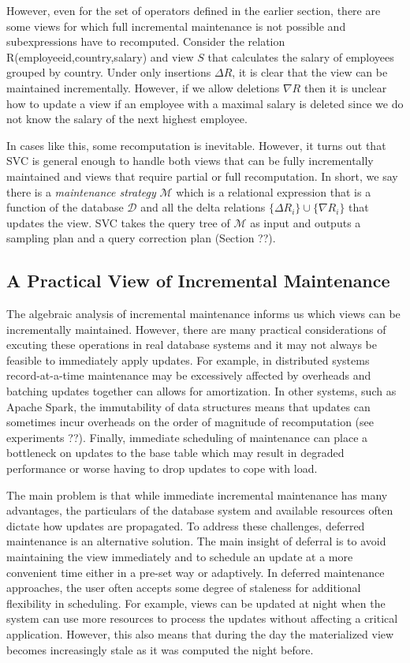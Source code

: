 However, even for the set of operators defined in the earlier section, there are some views for which full incremental maintenance is not possible and subexpressions have to recomputed. Consider the relation R(employeeid,country,salary) and view $S$ that calculates the \maxfunc salary of employees grouped by country. Under only insertions $\Delta R$, it is clear that the view can be maintained incrementally. 
However, if we allow deletions $\nabla R$ then it is unclear how to update a view if an employee with a maximal salary is deleted since we do not know the salary of the next highest employee. 

In cases like this, some recomputation is inevitable.
However, it turns out that SVC is general enough to handle both views that can be fully incrementally maintained and views that require partial or full recomputation.
In short, we say there is a \emph{maintenance strategy} $\mathcal{M}$ which is a relational expression that is a function of the database $\mathcal{D}$ and all the delta relations $\{\Delta R_i\} \cup \{\nabla R_i\}$ that updates the view.
SVC takes the query tree of $\mathcal{M}$ as input and outputs a sampling plan and a query correction plan (Section ??).

\subsection{A Practical View of Incremental Maintenance}
The algebraic analysis of incremental maintenance informs us which views can be incrementally maintained.
However, there are many practical considerations of excuting these operations in real database systems and it may not always be feasible to immediately apply updates.
For example, in distributed systems record-at-a-time maintenance may be excessively affected by overheads and batching updates together can allows for amortization.
In other systems, such as Apache Spark, the immutability of data structures means that updates can sometimes incur overheads on the order of magnitude of recomputation (see experiments ??).
Finally, immediate scheduling of maintenance can place a bottleneck on updates to the base table which may result in degraded performance or worse having to drop updates to cope with load.

The main problem is that while immediate incremental maintenance has many advantages, the particulars of the database system and available resources often dictate how updates are propagated.
To address these challenges, deferred maintenance is an alternative solution.
The main insight of deferral is to avoid maintaining the view immediately and to schedule an update at a more convenient time either in a pre-set way or adaptively.
In deferred maintenance approaches, the user often accepts some degree of staleness for additional flexibility in scheduling.
For example, views can be updated at night when the system can use more resources to process the updates without affecting a critical application.
However, this also means that during the day the materialized view becomes increasingly stale as it was computed the night before.

